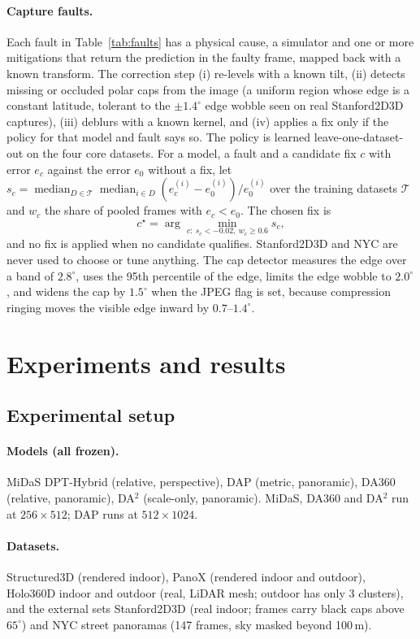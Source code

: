\documentclass{article}
\begin{document}
\paragraph{Capture faults.} Each fault in Table~\ref{tab:faults} has a physical cause, a simulator and one or more mitigations that return the prediction in the faulty frame, mapped back with a known transform. The correction step (i) re-levels with a known tilt, (ii) detects missing or occluded polar caps from the image (a uniform region whose edge is a constant latitude, tolerant to the $\pm1.4^\circ$ edge wobble seen on real Stanford2D3D captures), (iii) deblurs with a known kernel, and (iv) applies a fix only if the policy for that model and fault says so. The policy is learned leave-one-dataset-out on the four core datasets. For a model, a fault and a candidate fix $c$ with error $e_c$ against the error $e_0$ without a fix, let $s_c=\operatorname{median}_{D\in\mathcal T}\operatorname{median}_{i\in D}(e_c^{(i)}-e_0^{(i)})/e_0^{(i)}$ over the training datasets $\mathcal T$ and $w_c$ the share of pooled frames with $e_c<e_0$. The chosen fix is
\begin{equation}
c^\star=\arg\min_{c:\ s_c<-0.02,\ w_c\ge0.6}s_c,
\end{equation}
and no fix is applied when no candidate qualifies. Stanford2D3D and NYC are never used to choose or tune anything. The cap detector measures the edge over a band of $2.8^\circ$, uses the 95th percentile of the edge, limits the edge wobble to $2.0^\circ$, and widens the cap by $1.5^\circ$ when the JPEG flag is set, because compression ringing moves the visible edge inward by $0.7$--$1.4^\circ$.

\section{Experiments and results}
\subsection{Experimental setup}
\paragraph{Models (all frozen).} MiDaS DPT-Hybrid (relative, perspective), DAP (metric, panoramic), DA360 (relative, panoramic), DA$^2$ (scale-only, panoramic). MiDaS, DA360 and DA$^2$ run at $256\times512$; DAP runs at $512\times1024$.
\paragraph{Datasets.} Structured3D (rendered indoor), PanoX (rendered indoor and outdoor), Holo360D indoor and outdoor (real, LiDAR mesh; outdoor has only 3 clusters), and the external sets Stanford2D3D (real indoor; frames carry black caps above $65^\circ$) and NYC street panoramas (147 frames, sky masked beyond 100\,m).
\end{document}
